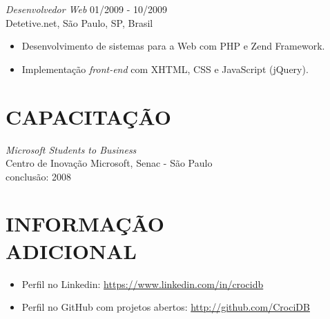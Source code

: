 \documentclass[line,margin]{res}
\begin{document}
\begin{resume}
                {\sl Desenvolvedor Web} \hfill 01/2009 - 10/2009 \\
                Detetive.net, São Paulo, SP, Brasil
                 \begin{itemize}  \itemsep 1pt
                 \item Desenvolvimento de sistemas para a Web com PHP e Zend Framework.
                 \item Implementação {\sl front-end} com XHTML, CSS e JavaScript (jQuery).
                 \end{itemize} 

\section{CAPACITAÇÃO}             
           {\sl Microsoft Students to Business} \\
                Centro de Inovação Microsoft, Senac - São Paulo \\
                conclusão: 2008 

\section{INFORMAÇÃO \\ ADICIONAL}
            \begin{itemize}  \itemsep 1pt
            \item Perfil no Linkedin: \href{https://www.linkedin.com/in/crocidb}{https://www.linkedin.com/in/crocidb}
            \item Perfil no GitHub com projetos abertos: \href{http://github.com/CrociDB}{http://github.com/CrociDB}
            \end{itemize} 

\end{resume}
\end{document}
